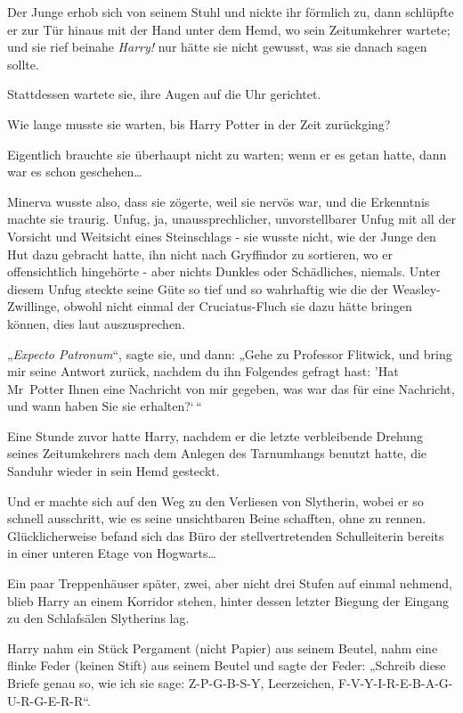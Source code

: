 {Der Junge erhob sich von seinem Stuhl und nickte ihr förmlich zu, dann schlüpfte er zur Tür hinaus mit der Hand unter dem Hemd, wo sein Zeitumkehrer wartete; und sie rief beinahe \emph{Harry!} nur hätte sie nicht gewusst, was sie danach sagen sollte.

Stattdessen wartete sie, ihre Augen auf die Uhr gerichtet.

Wie lange musste sie warten, bis Harry Potter in der Zeit zurückging?

Eigentlich brauchte sie überhaupt nicht zu warten; wenn er es getan hatte, dann war es schon geschehen…

Minerva wusste also, dass sie zögerte, weil sie nervös war, und die Erkenntnis machte sie traurig. Unfug, ja, unaussprechlicher, unvorstellbarer Unfug mit all der Vorsicht und Weitsicht eines Steinschlags - sie wusste nicht, wie der Junge den Hut dazu gebracht hatte, ihn nicht nach Gryffindor zu sortieren, wo er offensichtlich hingehörte - aber nichts Dunkles oder Schädliches, niemals. Unter diesem Unfug steckte seine Güte so tief und so wahrhaftig wie die der Weasley-Zwillinge, obwohl nicht einmal der Cruciatus-Fluch sie dazu hätte bringen können, dies laut auszusprechen.

„\emph{Expecto Patronum}“, sagte sie, und dann: „Gehe zu Professor Flitwick, und bring mir seine Antwort zurück, nachdem du ihn Folgendes gefragt hast: 'Hat Mr~Potter Ihnen eine Nachricht von mir gegeben, was war das für eine Nachricht, und wann haben Sie sie erhalten?`\,“

Eine Stunde zuvor hatte Harry, nachdem er die letzte verbleibende Drehung seines Zeitumkehrers nach dem Anlegen des Tarnumhangs benutzt hatte, die Sanduhr wieder in sein Hemd gesteckt.

Und er machte sich auf den Weg zu den Verliesen von Slytherin, wobei er so schnell ausschritt, wie es seine unsichtbaren Beine schafften, ohne zu rennen. Glücklicherweise befand sich das Büro der stellvertretenden Schulleiterin bereits in einer unteren Etage von Hogwarts…

Ein paar Treppenhäuser später, zwei, aber nicht drei Stufen auf einmal nehmend, blieb Harry an einem Korridor stehen, hinter dessen letzter Biegung der Eingang zu den Schlafsälen Slytherins lag.

Harry nahm ein Stück Pergament (nicht Papier) aus seinem Beutel, nahm eine flinke Feder (keinen Stift) aus seinem Beutel und sagte der Feder: „Schreib diese Briefe genau so, wie ich sie sage: Z-P-G-B-S-Y, Leerzeichen, F-V-Y-I-R-E-B-A-G-U-R-G-E-R-R“.

}
